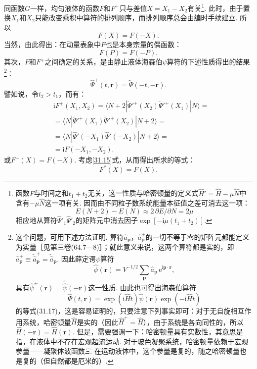 同函数$G$一样，均匀液体的函数$F$和$F^{+}$只与差值$X=X_{1}-X_{2}$有关\footnote{函数$F$与时间之和$t_{1}+t_{2}$无关，这一性质与哈密顿量的定义式$\hat{H}'=\hat{H}-\mu\hat{N}$中含有$-\mu\hat{N}$这一项有关. 因而由不同粒子数系统能量本征值之差可消去这一项：
\begin{equation*}
E(N+2)-E(N)\approx 2\,\partial E/\partial N=2\mu
\end{equation*}
相应地从算符$\hat{\Psi}'_{1}\hat{\Psi}'_{2}$的矩阵元中消去因子$\exp[-\mathrm{i}\mu(t_{1}+t_{2})]$.}. 此时，由于置换$X_{1}$和$X_{2}$只能改变乘积中算符的排列顺序，而排列顺序总会由编时手续建立. 所以
\begin{equation}
F(X)=F(-X).
\label{31.15}
\end{equation}
当然，由此得出：在动量表象中$F$也是本身宗量的偶函数：
\begin{equation}
F(P)=F(-P).
\label{31.16}
\end{equation}
其次，$F$和$F^{+}$之间确定的关系，是由静止液体海森伯$\psi$算符的下述性质得出的结果\footnote{这个问题，可用下述方法证明. 算符$\hat{a}_{\bm{p}}$，$\hat{a}^{+}_{\bm{p}}$的一切不等于零的矩阵元都能定义为实量［见第三卷(64.7—8)］；就此意义来说，这两个算符都是实的，即$\hat{a}^{+}_{\bm{p}}\equiv\tilde{\hat{a}}^{+}_{\bm{p}}=\tilde{\hat{a}}_{\bm{p}}$. 因此薛定谔$\psi$算符
\begin{equation*}
\hat{\psi}(\bm{r})=V^{-1/2}\sum_{\bm{p}}\hat{a}_{\bm{p}}\,\mathrm{e}^{\mathrm{i}\bm{p}\cdot\bm{r}},
\end{equation*}
具有$\hat{\psi}^{+}(\bm{r})=\tilde{\hat{\psi}}(-\bm{r})$这一性质. 由此也可得出海森伯算符
\begin{equation*}
\hat{\Psi}(t,\bm{r})=\exp(\mathrm{i}\hat{H}t)\hat{\psi}(\bm{r})\exp(-\mathrm{i}\hat{H}t)
\end{equation*}
的等式(31.17)，这是容易证明的，只要注意下列事实即可：对于无自旋相互作用系统，哈密顿量$\hat{H}$是实的（因此$\hat{H}^{+}=\hat{H}$），由于系统是各向同性的，所以$\hat{H}(-\bm{r})=\hat{H}(\bm{r})$. 但是，需要强调一下：哈密顿量具有实数性，其意思是指，在液体中不存在宏观超流运动. 对于玻色凝聚系统，哈密顿量依赖于宏观参量——凝聚体波函数$\Xi$. 在运动液体中，这个参量是复的，随之哈密顿量也是复的（但自然都是厄米的）.}：
\begin{equation}
\hat{\Psi}^{+}(t,\bm{r})=\tilde{\Psi}(-t,-\bm{r}).
\label{31.17}
\end{equation}
譬如说，令$t_{2}>t_{1}$，而有：
\begin{equation*}
\begin{aligned}
&\mathrm{i}F^{+}(X_{1},X_{2})
=\langle N+2|\tilde{\Psi}'^{+}(X_{2})\tilde{\Psi}'^{+}(X_{1})|N\rangle={}\\
&=\langle N|\tilde{\Psi}'^{+}(X_{1})\tilde{\Psi}'^{+}(X_{2})|N+2\rangle={}\\
&=\langle N|\hat{\Psi}'(-X_{1})\hat{\Psi}'(-X_{2})|N+2\rangle={}\\
&=\mathrm{i}F(-X_{1},-X_{2}).
\end{aligned}
\end{equation*}
或$F^{+}(X)=F(-X)$. 考虑\eqref{31.15}式，从而得出所求的等式：
\begin{equation}
F^{*}(X)=F(X).
\label{31.18}
\end{equation}

